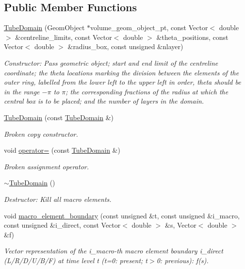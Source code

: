 \subsection*{Public Member Functions}
\begin{DoxyCompactItemize}
\item 
\hyperlink{classoomph_1_1TubeDomain_a025d462a0676026e5902d07ffbb3510e}{Tube\+Domain} (Geom\+Object $\ast$volume\+\_\+geom\+\_\+object\+\_\+pt, const Vector$<$ double $>$ \&centreline\+\_\+limits, const Vector$<$ double $>$ \&theta\+\_\+positions, const Vector$<$ double $>$ \&radius\+\_\+box, const unsigned \&nlayer)
\begin{DoxyCompactList}\small\item\em Constructor\+: Pass geometric object; start and end limit of the centreline coordinate; the theta locations marking the division between the elements of the outer ring, labelled from the lower left to the upper left in order, theta should be in the range $-\pi$ to $\pi$; the corresponding fractions of the radius at which the central box is to be placed; and the number of layers in the domain. \end{DoxyCompactList}\item 
\hyperlink{classoomph_1_1TubeDomain_a39d38474ae91e479d615e315445b22c5}{Tube\+Domain} (const \hyperlink{classoomph_1_1TubeDomain}{Tube\+Domain} \&)
\begin{DoxyCompactList}\small\item\em Broken copy constructor. \end{DoxyCompactList}\item 
void \hyperlink{classoomph_1_1TubeDomain_a3731e671028bb0ea3b01e7fe2723cbbc}{operator=} (const \hyperlink{classoomph_1_1TubeDomain}{Tube\+Domain} \&)
\begin{DoxyCompactList}\small\item\em Broken assignment operator. \end{DoxyCompactList}\item 
\hyperlink{classoomph_1_1TubeDomain_ad836e9ab146d2317ed55ee199d54b3e4}{$\sim$\+Tube\+Domain} ()
\begin{DoxyCompactList}\small\item\em Destructor\+: Kill all macro elements. \end{DoxyCompactList}\item 
void \hyperlink{classoomph_1_1TubeDomain_a1f16dde7ad082e2557dff9c737dae6c0}{macro\+\_\+element\+\_\+boundary} (const unsigned \&t, const unsigned \&i\+\_\+macro, const unsigned \&i\+\_\+direct, const Vector$<$ double $>$ \&s, Vector$<$ double $>$ \&f)
\begin{DoxyCompactList}\small\item\em Vector representation of the i\+\_\+macro-\/th macro element boundary i\+\_\+direct (L/\+R/\+D/\+U/\+B/F) at time level t (t=0\+: present; t$>$0\+: previous)\+: f(s). \end{DoxyCompactList}\end{DoxyCompactItemize}
